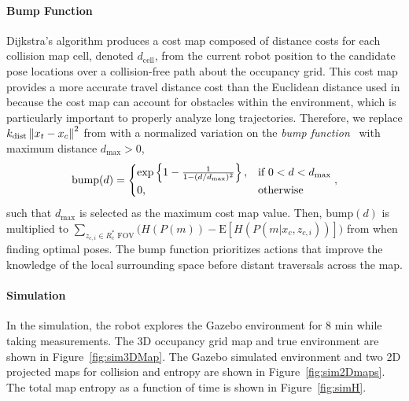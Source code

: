 \paragraph{Bump Function}
Dijkstra's algorithm produces a cost map composed of distance costs for each collision map cell, denoted $d_\text{cell}$, from the current robot position to the candidate pose locations over a collision-free path about the occupancy grid. This cost map provides a more accurate travel distance cost than the Euclidean distance used in  because the cost map can account for obstacles within the environment, which is particularly important to properly analyze long trajectories. Therefore, we replace $k_\text{dist}\left\| x_t-x_c \right\|^2$ from  with a normalized variation on the \emph{bump function}~\cite{Joh06} with maximum distance $d_\text{max}>0$,
\begin{align}
\label{eqn:BumpFunRef}
\text{bump}(d)= 
\begin{cases}
    \exp\left\{ {1-\frac1{1-(d/d_\text{max})^2}} \right\},			& \text{if }0<d<d_\text{max}\\
    0,              				& \text{otherwise}
\end{cases},
\end{align}
such that $d_\text{max}$ is selected as the maximum cost map value. Then, $\text{bump}(d)$ is multiplied to $\sum_{z_{c,i}\in R_{c}^*\text{ FOV}}\bigg(H(P(m))-\text{E}\left[H(P(m|x_c,z_{c,i}))\right]\bigg)$ from  when finding optimal poses. The bump function prioritizes actions that improve the knowledge of the local surrounding space before distant traversals across the map.

\paragraph{Simulation}

In the simulation, the robot explores the Gazebo environment for $8$ min while taking measurements. The 3D occupancy grid map and true environment are shown in Figure~\ref{fig:sim3DMap}. The Gazebo simulated environment and two 2D projected maps for collision and entropy are shown in Figure~\ref{fig:sim2Dmaps}. The total map entropy as a function of time is shown in Figure~\ref{fig:simH}.


